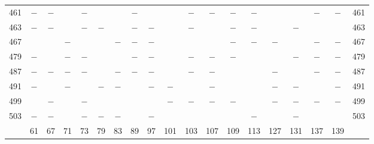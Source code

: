 \begin{center}
\begin{tabular}{r|c|c|c|c|c|c|c|c|c|c|c|c|c|c|c|c|c|r}
461 & $-$ & $-$ &  & $-$ &  &  & $-$ &  &  & $-$ & $-$ & $-$ & $-$ &  &  & $-$ & $-$ & 461\\
463 & $-$ & $-$ &  & $-$ & $-$ &  & $-$ & $-$ &  & $-$ &  & $-$ & $-$ &  & $-$ &  &  & 463\\
467 &  &  & $-$ &  &  & $-$ & $-$ & $-$ &  &  &  & $-$ & $-$ & $-$ &  & $-$ & $-$ & 467\\
479 & $-$ &  & $-$ & $-$ &  &  & $-$ & $-$ &  & $-$ & $-$ & $-$ &  &  & $-$ & $-$ & $-$ & 479\\
487 & $-$ & $-$ & $-$ & $-$ &  & $-$ & $-$ & $-$ &  & $-$ & $-$ &  &  & $-$ &  & $-$ & $-$ & 487\\
491 & $-$ &  & $-$ &  & $-$ & $-$ &  & $-$ & $-$ &  & $-$ &  &  & $-$ & $-$ &  & $-$ & 491\\
499 &  & $-$ &  & $-$ &  &  &  &  & $-$ & $-$ & $-$ & $-$ &  & $-$ & $-$ & $-$ & $-$ & 499\\
503 & $-$ & $-$ &  & $-$ & $-$ & $-$ &  & $-$ &  &  &  &  & $-$ &  & $-$ &  &  & 503\\
\hline
 & 61 & 67 & 71 & 73 & 79 & 83 & 89 & 97 & 101 & 103 & 107 & 109 & 113 & 127 & 131 & 137 & 139 & \\
\hline
\end{tabular}\endgroup\end{center}

